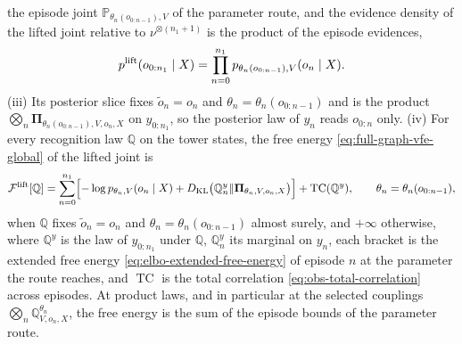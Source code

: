 the episode joint $\mathbb P_{\theta_n(o_{0:n-1}),V}$ of the parameter route, and the
evidence density of the lifted joint relative to $\nu^{\otimes(n_1+1)}$ is the product
of the episode evidences,
\begin{equation}
p^{\mathrm{lift}}(o_{0:n_1}\mid X)=\prod_{n=0}^{n_1}p_{\theta_n(o_{0:n-1}),V}(o_n\mid X).
\label{eq:full-graph-lifted-evidence}
\end{equation}
(iii) Its posterior slice fixes $\widetilde o_n=o_n$ and $\theta_n=\theta_n(o_{0:n-1})$
and is the product $\bigotimes_n\boldsymbol\Pi_{\theta_n(o_{0:n-1}),V,o_n,X}$ on
$y_{0:n_1}$, so the posterior law of $y_n$ reads $o_{0:n}$ only. (iv) For every
recognition law $\mathbb Q$ on the tower states, the free energy
\eqref{eq:full-graph-vfe-global} of the lifted joint is
\begin{equation}
\mathcal F^{\mathrm{lift}}[\mathbb Q]
=\sum_{n=0}^{n_1}\Bigl[-\log p_{\theta_n,V}(o_n\mid X)
+D_{\mathrm{KL}}\bigl(\mathbb Q^{y}_n\Vert\boldsymbol\Pi_{\theta_n,V,o_n,X}\bigr)\Bigr]
+\operatorname{TC}(\mathbb Q^{y}),
\qquad\theta_n=\theta_n(o_{0:n-1}),
\label{eq:full-graph-lifted-free-energy}
\end{equation}
when $\mathbb Q$ fixes $\widetilde o_n=o_n$ and $\theta_n=\theta_n(o_{0:n-1})$ almost
surely, and $+\infty$ otherwise, where $\mathbb Q^{y}$ is the law of $y_{0:n_1}$ under
$\mathbb Q$, $\mathbb Q^{y}_n$ its marginal on $y_n$, each bracket is the extended free
energy \eqref{eq:elbo-extended-free-energy} of episode $n$ at the parameter the route
reaches, and $\operatorname{TC}$ is the total correlation
\eqref{eq:obs-total-correlation} across episodes. At product laws, and in particular at
the selected couplings $\bigotimes_n\mathbb Q^{\theta_n}_{V,o_n,X}$, the free energy
is the sum of the episode bounds of the parameter route. 

